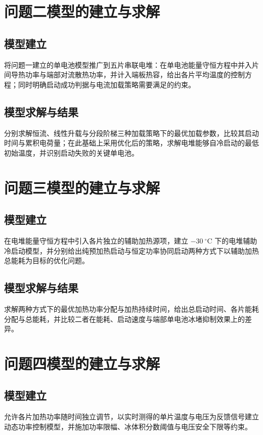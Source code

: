 \documentclass{gmcmthesis}
\begin{document}
\section{问题二模型的建立与求解}
\label{sec:model2}

\subsection{模型建立}
将问题一建立的单电池模型推广到五片串联电堆：在单电池能量守恒方程中并入片间导热功率与端部对流散热功率，并计入端板热容，给出各片平均温度的控制方程；同时明确启动成功判据与电流加载策略需要满足的约束。

\subsection{模型求解与结果}
分别求解恒流、线性升载与分段阶梯三种加载策略下的最优加载参数，比较其启动时间与累积电荷量；在此基础上采用优化后的策略，求解电堆能够自冷启动的最低初始温度，并识别启动失败的关键单电池。

\section{问题三模型的建立与求解}
\label{sec:model3}

\subsection{模型建立}
在电堆能量守恒方程中引入各片独立的辅助加热源项，建立 $-30~^{\circ}\mathrm{C}$ 下的电堆辅助冷启动模型，并分别给出纯预加热启动与恒定功率协同启动两种方式下以辅助加热总能耗为目标的优化问题。

\subsection{模型求解与结果}
求解两种方式下的最优加热功率分配与加热持续时间，给出总启动时间、各片能耗分配与总能耗，并比较二者在能耗、启动速度与端部单电池冰堵抑制效果上的差异。

\section{问题四模型的建立与求解}
\label{sec:model4}

\subsection{模型建立}
允许各片加热功率随时间独立调节，以实时测得的单片温度与电压为反馈信号建立动态功率控制模型，并施加功率限幅、冰体积分数阈值与电压安全下限等约束。
\end{document}
